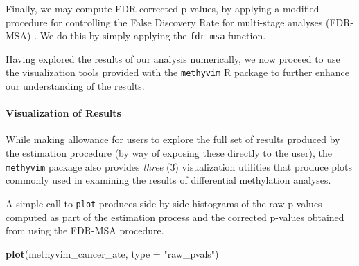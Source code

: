 \documentclass[9pt,a4paper,]{extarticle}
\newenvironment{Shaded}{\begin{snugshade}}{\end{snugshade}}
\newcommand{\DataTypeTok}[1]{\textcolor[rgb]{0.13,0.29,0.53}{#1}}
\newcommand{\KeywordTok}[1]{\textcolor[rgb]{0.13,0.29,0.53}{\textbf{#1}}}
\newcommand{\NormalTok}[1]{#1}
\newcommand{\OperatorTok}[1]{\textcolor[rgb]{0.81,0.36,0.00}{\textbf{#1}}}
\newcommand{\StringTok}[1]{\textcolor[rgb]{0.31,0.60,0.02}{#1}}
\theoremstyle{definition}
\theoremstyle{definition}
\theoremstyle{definition}
\theoremstyle{remark}
\begin{document}
Finally, we may compute FDR-corrected p-values, by applying a modified procedure
for controlling the False Discovery Rate for multi-stage analyses (FDR-MSA)
\citep{tuglus2009modified}. We do this by simply applying the \texttt{fdr\_msa} function.

\begin{Shaded}
\end{Shaded}

Having explored the results of our analysis numerically, we now proceed to use
the visualization tools provided with the \texttt{methyvim} R package to further
enhance our understanding of the results.

\hypertarget{visualization-of-results}{%
\paragraph{Visualization of Results}\label{visualization-of-results}}

While making allowance for users to explore the full set of results produced by
the estimation procedure (by way of exposing these directly to the user), the
\texttt{methyvim} package also provides \emph{three} (3) visualization utilities that
produce plots commonly used in examining the results of differential methylation
analyses.

A simple call to \texttt{plot} produces side-by-side histograms of the raw p-values
computed as part of the estimation process and the corrected p-values obtained
from using the FDR-MSA procedure.

\begin{Shaded}
\begin{Highlighting}[]
\KeywordTok{plot}\NormalTok{(methyvim_cancer_ate, }\DataTypeTok{type =} \StringTok{"raw_pvals"}\NormalTok{)}
\end{Highlighting}
\end{Shaded}
\end{document}
